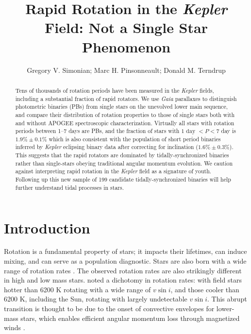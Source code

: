 \documentclass[manuscript]{aastex6}
\newcommand{\vsini}{\ensuremath{v \sin i}}
\newcommand{\Kepler}{\mbox{\textit{Kepler}}}
\newcommand{\Gaia}{\mbox{\textit{Gaia}}}
\begin{document}
\title{Rapid Rotation in the \Kepler{} Field: Not a Single Star
Phenomenon}
\author{Gregory V. Simonian; Marc H. Pinsonneault; Donald M. Terndrup}

\begin{abstract}
    Tens of thousands of rotation periods have been measured in the
    \Kepler{} fields, including a substantial fraction of rapid rotators. We 
    use \Gaia{} parallaxes to distinguish photometric binaries (PBs) from
    single stars on the unevolved lower main sequence, and compare their
    distribution of rotation properties to those of single stars both with and 
    without APOGEE spectroscopic characterization. Virtually all stars 
    with rotation periods between 1--7 days are PBs, and the fraction of stars
    with \(1 \textrm{ day } < P < 7\) day is \(1.9\% \pm 0.1\%\) which
    is also consistent with the population of short period binaries inferred 
    by \Kepler{} eclipsing binary data after correcting for inclination
    (\(1.6\% \pm 0.3\%\)). This suggests that the rapid rotators 
    are dominated by tidally-synchronized binaries rather than single-stars 
    obeying traditional angular momentum evolution. We caution 
    against interpreting rapid rotation in the \Kepler{} field 
    as a signature of youth. Following up this new sample of 199 candidate 
    tidally-synchronized binaries will help further understand 
    tidal processes in stars.
\end{abstract}

\section{Introduction}

Rotation is a fundamental property of stars; it impacts their lifetimes, can
induce mixing, and can serve as a population diagnostic. Stars are also born 
with a wide range of rotation rates \citep{Attridge92, Herbst00, Henderson12}.
The observed rotation rates are also strikingly different in high and low mass 
stars. \citet{Kraft67} noted a dichotomy in rotation rates: with field stars 
hotter than 6200 K rotating with a wide range of \vsini, and those cooler than 
6200 K, including the Sun, rotating with largely undetectable \vsini. This abrupt transition is thought to
be due to the onset of convective envelopes for lower-mass stars, which 
enables efficient angular momentum loss through magnetized winds 
\citep{Parker58,Weber67}.
\end{document}
